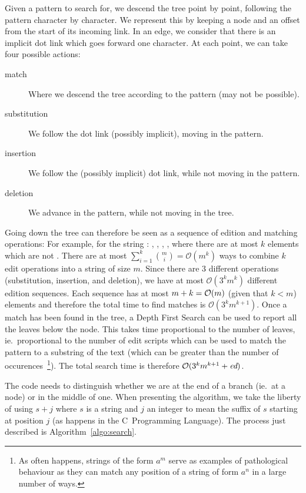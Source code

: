 Given a pattern to search for, we descend the tree point by point, following the pattern character by character. We represent this by keeping a node and an offset from the start of its incoming link. In an edge, we consider that there is an implicit dot link which goes forward one character. At each point, we can take four possible actions:

\begin{description}
\item[match] Where we descend the tree according to the pattern (may not be possible).
\item[substitution] We follow the dot link (possibly implicit), moving in the pattern.
\item[insertion] We follow the (possibly implicit) dot link, while not moving in the pattern.
\item[deletion] We advance in the pattern, while not moving in the tree.
\end{description}


%
Going down the tree can therefore be seen as a sequence of edition and matching operations: For example, for the string : , , , , where there are at most $k$ elements which are not . There are at most $\sum_{i=1}^k{m \choose i}=\mathcal{O}(m^k)$ ways to combine $k$ edit operations into a string of size $m$. Since there are $3$ different operations (substitution, insertion, and deletion), we have at most $\mathcal{O}(3^k m^k)$ different edition sequences. Each sequence has at most $m+k=\mathcal{O}(m)$ (given that $k<m$) elements and therefore the total time to find matches is $\mathcal{O}(3^k m^{k+1})$. Once a match has been found in the tree, a Depth First Search can be used to report all the leaves below the node. This takes time proportional to the number of leaves, ie.\ proportional to the number of edit scripts which can be used to match the pattern to a substring of the text (which can be greater than the number of occurences~\footnote{As often happens, strings of the form $a^m$ serve as examples of pathological behaviour as they can match any position of a string of form $a^n$ in a large number of ways.}). The total search time is therefore $\mathcal{O}(3^k m^{k+1} + \mbox{\it ed})$.

The code needs to distinguish whether we are at the end of a branch (ie.\ at a node) or in the middle of one. When presenting the algorithm, we take the liberty of using $s+j$ where $s$ is a string and $j$ an integer to mean the suffix of $s$ starting at position $j$ (as happens in the C~Programming Language). The process just described is Algorithm~\ref{algo:search}.

